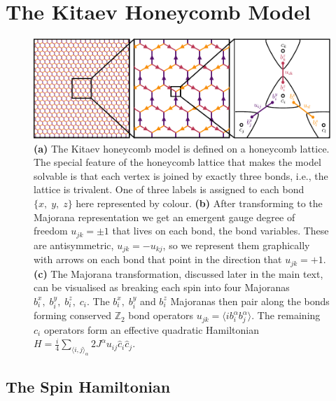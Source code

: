 \hypertarget{bg-hkm-model}{%
\section{The Kitaev Honeycomb Model}\label{bg-hkm-model}}

\hypertarget{fig:intro_figure_by_hand}{%
\begin{figure}
\centering
\includegraphics[width=1\textwidth,height=\textheight]{figure_code/amk_chapter/intro/honeycomb_zoom/intro_figure_by_hand}
\caption[{The Kitaev Honeycomb Model}]{\textbf{(a)} The Kitaev honeycomb model is defined on a honeycomb lattice. The special feature of the honeycomb lattice that makes the model solvable is that each vertex is joined by exactly three bonds, i.e., the lattice is trivalent. One of three labels is assigned to each bond \(\{x,\;y,\;z\}\) here represented by colour. \textbf{(b)} After transforming to the Majorana representation we get an emergent gauge degree of freedom \(u_{jk} = \pm 1\) that lives on each bond, the bond variables. These are antisymmetric, \(u_{jk} = -u_{kj}\), so we represent them graphically with arrows on each bond that point in the direction that \(u_{jk} = +1\). \textbf{(c)} The Majorana transformation, discussed later in the main text, can be visualised as breaking each spin into four Majoranas \(b_i^x,\;b_i^y,\;b_i^z,\;c_i\). The \(b_i^x,\;b_i^y\) and \(b_i^z\) Majoranas then pair along the bonds forming conserved \(\mathbb{Z}_2\) bond operators \(u_{jk} = \langle i b_i^\alpha b_j^\alpha \rangle\). The remaining \(c_i\) operators form an effective quadratic Hamiltonian \(H = \frac{i}{4} \sum_{\langle i,j\rangle_\alpha} 2J^{\alpha} u_{ij} \hat{c}_i \hat{c}_j\).}
\label{fig:intro_figure_by_hand}
\end{figure}
}

\hypertarget{the-spin-hamiltonian}{%
\subsection{The Spin Hamiltonian}\label{the-spin-hamiltonian}}

